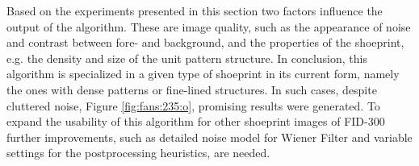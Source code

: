\documentclass[draft,final]{vutinfth} %
\begin{document}
\par
Based on the experiments presented in this section two factors influence the output of the algorithm.
These are image quality, such as the appearance of noise and contrast between fore- and background, and the properties of the shoeprint, e.g. the density and size of the unit pattern structure.
In conclusion, this algorithm is specialized in a given type of shoeprint in its current form, namely the ones with dense patterns or fine-lined structures. 
In such cases, despite cluttered noise, Figure \ref{fig:fans:235:o}, promising results were generated.
To expand the usability of this algorithm for other shoeprint images of FID-300 further improvements, such as detailed noise model for Wiener Filter and variable settings for the postprocessing heuristics, are needed. 


\end{document}
